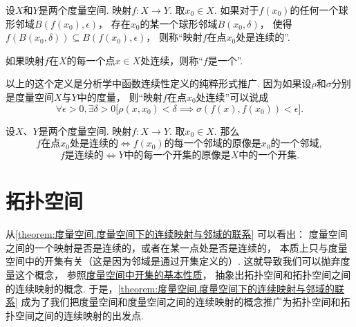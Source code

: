 \begin{definition}\label{definition:度量空间.连续映射的概念}
设\(X\)和\(Y\)是两个度量空间.
映射\(f\colon X \to Y\).
取\(x_0 \in X\).
如果对于\(f(x_0)\)的任何一个球形邻域\(B(f(x_0),\epsilon)\)，
存在\(x_0\)的某一个球形邻域\(B(x_0,\delta)\)，
使得\(f(B(x_0,\delta)) \subseteq B(f(x_0),\epsilon)\)，
则称“映射\(f\)在点\(x_0\)处是连续的”.

如果映射\(f\)在\(X\)的每一个点\(x \in X\)处连续，则称“\(f\)是一个”.
\end{definition}
以上的这个定义是分析学中函数连续性定义的纯粹形式推广.
因为如果设\(\rho\)和\(\sigma\)分别是度量空间\(X\)与\(Y\)中的度量，
则“映射\(f\)在点\(x_0\)处连续”可以说成\[
\forall\epsilon>0,
\exists\delta>0
\bigl[
\rho(x,x_0)<\delta
\implies
\sigma(f(x),f(x_0))<\epsilon
\bigr].
\]

\begin{theorem}\label{theorem:度量空间.度量空间下的连续映射与邻域的联系}
设\(X\)、\(Y\)是两个度量空间.
映射\(f\colon X \to Y\).
取\(x_0 \in X\).
那么\[
\text{\(f\)在点\(x_0\)处是连续的}
\iff
\text{\(f(x_0)\)的每一个邻域的原像是\(x_0\)的一个邻域},
\]\[
\text{\(f\)是连续的}
\iff
\text{\(Y\)中的每一个开集的原像是\(X\)中的一个开集}.
\]
\end{theorem}


\begingroup
\def\T{\mathfrak T}%
\def\oT{\overline{\mathfrak T}}%

\section{拓扑空间}
从\cref{theorem:度量空间.度量空间下的连续映射与邻域的联系} 可以看出：
度量空间之间的一个映射是否是连续的，或者在某一点处是否是连续的，
本质上只与度量空间中的开集有关（这是因为邻域是通过开集定义的）.
这就导致我们可以抛弃度量这个概念，
参照\hyperref[theorem:度量空间.开集的性质]{度量空间中开集的基本性质}，
抽象出拓扑空间和拓扑空间之间的连续映射的概念.
于是，\cref{theorem:度量空间.度量空间下的连续映射与邻域的联系}
成为了我们把度量空间和度量空间之间的连续映射的概念推广为拓扑空间和拓扑空间之间的连续映射的出发点.

